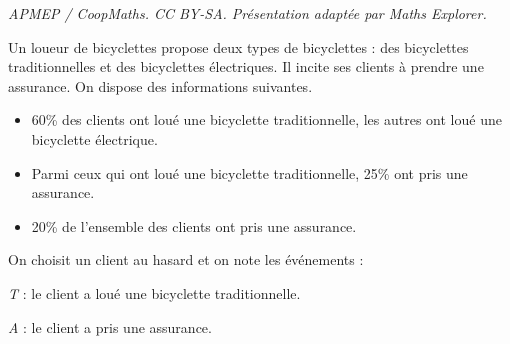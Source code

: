 \documentclass[10pt]{article}
\begin{document}
\noindent\textit{APMEP / CoopMaths. CC BY-SA. Présentation adaptée par Maths Explorer.}\par\medskip
Un loueur de bicyclettes propose deux types de bicyclettes : des bicyclettes traditionnelles et des bicyclettes électriques. Il incite ses clients à prendre une assurance. On dispose des informations suivantes.
\begin{itemize}[label=$\bullet$]
	\item 60\% des clients ont loué une bicyclette traditionnelle, les autres ont loué une bicyclette électrique.
	\item Parmi ceux qui ont loué une bicyclette traditionnelle, 25\% ont pris une assurance.
	\item 20\% de l'ensemble des clients ont pris une assurance.
\end{itemize}

On choisit un client au hasard et on note les événements :

\textit{T} : \og{}le client a loué une bicyclette traditionnelle\fg{}.

\textit{A} : \og{}le client a pris une assurance\fg{}.
\end{document}

